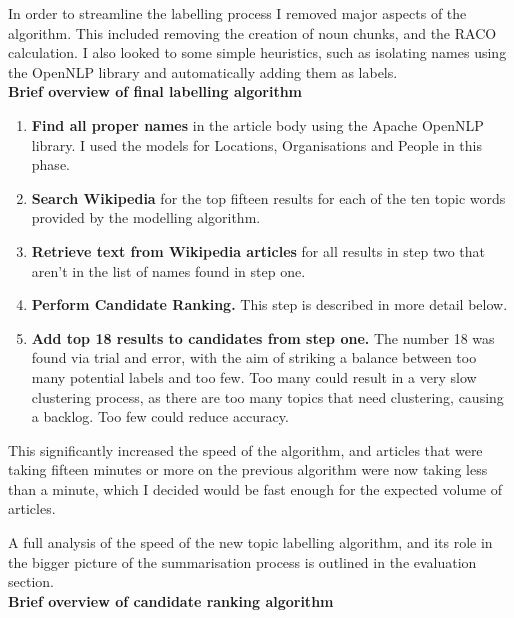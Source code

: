 \documentclass[12pt]{article}
\begin{document}
In order to streamline the labelling process I removed major aspects of the algorithm. This included removing the creation of noun chunks, and the RACO calculation. I also looked to some simple heuristics, such as isolating names using the OpenNLP library and automatically adding them as labels. \\

\textbf{Brief overview of final labelling algorithm} \\

\begin{enumerate}
	\item \textbf{Find all proper names} in the article body using the Apache OpenNLP library. I used the models for Locations, Organisations and People in this phase. \\
	\item \textbf{Search Wikipedia} for the top fifteen results for each of the ten topic words provided by the modelling algorithm. \\
	\item \textbf{Retrieve text from Wikipedia articles} for all results in step two that aren't in the list of names found in step one. \\
	\item \textbf{Perform Candidate Ranking.} This step is described in more detail below. \\
	\item \textbf{Add top 18 results to candidates from step one.} The number 18 was found via trial and error, with the aim of striking a balance between too many potential labels and too few. Too many could result in a very slow clustering process, as there are too many topics that need clustering, causing a backlog. Too few could reduce accuracy. \\
\end{enumerate}

This significantly increased the speed of the algorithm, and articles that were taking fifteen minutes or more on the previous algorithm were now taking less than a minute, which I decided would be fast enough for the expected volume of articles.

A full analysis of the speed of the new topic labelling algorithm, and its role in the bigger picture of the summarisation process is outlined in the evaluation section. \\

\textbf{Brief overview of candidate ranking algorithm} \\
\end{document}
